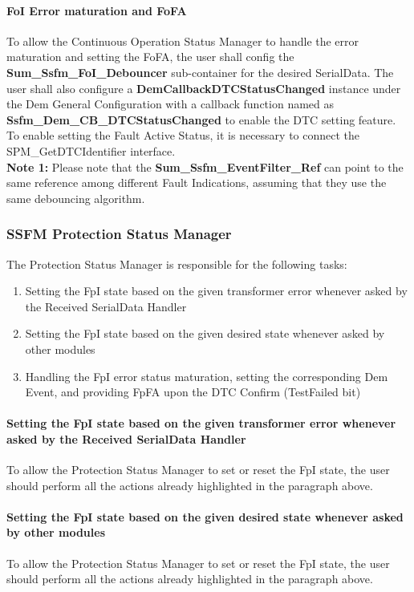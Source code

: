 \paragraph{FoI Error maturation and FoFA}
To allow the Continuous Operation Status Manager to handle the error maturation and setting the FoFA, the user shall config the \textbf{Sum\_Ssfm\_FoI\_Debouncer} sub-container for the desired SerialData.
The user shall also configure a \textbf{DemCallbackDTCStatusChanged} instance under the Dem General Configuration 
with a callback function named as \textbf{Ssfm\_Dem\_CB\_DTCStatusChanged} to enable the DTC setting feature.
To enable setting the Fault Active Status, it is necessary to connect the SPM\_GetDTCIdentifier interface.
\\\textbf{Note 1:} Please note that the \textbf{Sum\_Ssfm\_EventFilter\_Ref} can point to the same reference among different Fault Indications, assuming that they use the same debouncing algorithm. 

\subsubsection{SSFM Protection Status Manager}
\label{subsec:protectionstatusmanager}

The Protection Status Manager is responsible for the following tasks:

\begin{enumerate}
\item Setting the FpI state based on the given transformer error whenever asked by the Received SerialData Handler
\item Setting the FpI state based on the given desired state whenever asked by other modules
\item Handling the FpI error status maturation, setting the corresponding Dem Event, and providing FpFA upon the DTC Confirm (TestFailed bit) 
\end{enumerate}

\paragraph{Setting the FpI state based on the given transformer error whenever asked by the Received SerialData Handler}
To allow the Protection Status Manager to set or reset the FpI state, the user should perform all the actions already highlighted in the paragraph above.

\paragraph{Setting the FpI state based on the given desired state whenever asked by other modules}
To allow the Protection Status Manager to set or reset the FpI state, the user should perform all the actions already highlighted in the paragraph above.

